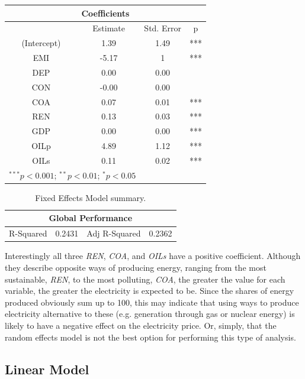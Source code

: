 \documentclass[a4paper,12pt]{book}
\begin{document}
\begin{table}[tb]
\begin{center}
\begin{tabular}{|c|c|c|c|}
\hline
\multicolumn{4}{|c|}{Coefficients}\\
\hline
&Estimate&Std. Error&p\\
\hline
(Intercept)&1.39&1.49&***\\
EMI&-5.17&1&***\\
DEP&0.00&0.00&\\
CON&-0.00&0.00&\\
COA&0.07&0.01&***\\
REN&0.13&0.03&***\\
GDP&0.00&0.00&***\\
OILp&4.89&1.12&***\\
OILs&0.11&0.02&***\\
\hline
\multicolumn{2}{l}{\scriptsize{$^{***}p<0.001$; $^{**}p<0.01$; $^{*}p<0.05$}}
\end{tabular}
\end{center}
\end{table}
\begin{table}[tb]
\begin{center}
\begin{tabular}{|c|c|c|c|}
\hline
\multicolumn{4}{|c|}{Global Performance}\\
\hline
R-Squared&0.2431&Adj R-Squared&0.2362\\
\hline
\end{tabular}
\caption{Fixed Effects Model summary.}
\label{Tab:fx}
\end{center}
\end{table}

Interestingly all three \textit{REN}, \textit{COA}, and \textit{OILs} have a positive coefficient. Although they describe opposite ways of producing energy, ranging from the most sustainable, \textit{REN}, to the most polluting, \textit{COA}, the greater the value for each variable, the greater the electricity is expected to be. Since the shares of energy produced obviously sum up to 100, this may indicate that using ways to produce electricity alternative to these (e.g. generation through gas or nuclear energy) is likely to have a negative effect on the electricity price. Or, simply, that the random effects model is not the best option for performing this type of analysis.

\subsection{Linear Model}
\end{document}
